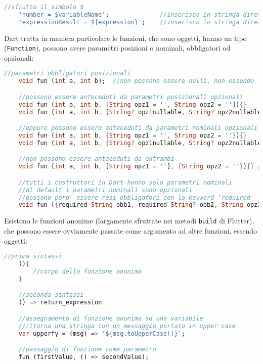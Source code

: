 \begin{lstlisting}[language=dart, firstnumber=1,caption={Dart interpolazone stringhe}]
    //sfrutto il simbolo $
    'number = $variableName';              //inserisco in stringa direttamente una variabile
    'expressionResult = ${expression}';    //inserisco in stringa direttamente un'espressione
\end{lstlisting}

Dart tratta in maniera particolare le funzioni, che sono oggetti, hanno un tipo (\verb+Function+), possono avere parametri posizioni o nominali, obbligatori od opzionali: 

\begin{lstlisting}[language=dart, firstnumber=1,caption={Dart parametri funzioni}]
    //parametri obbligatori posizionali
    void fun (int a, int b);  //non possono essere nulli, non essendo 'int? a'

    //possono essere anteceduti da parametri posizionali opzionali
    void fun (int a, int b, [String opz1 = '', String opz2 = '']){}
    void fun (int a, int b, [String? opz1nullable, String? opz2nullable]){}

    //oppure possono essere anteceduti da parametri nominali opzionali
    void fun (int a, int b, {String opz1 = '', String opz2 = ''}){}
    void fun (int a, int b, {String? opz1nullable, String? opz2nullable}){}

    //non possono essere anteceduti da entrambi
    void fun (int a, int b, [String opz1 = ''], {String opz2 = ''}){} //compile error

    //tutti i costruttori in Dart hanno solo parametri nominali
    //di default i parametri nominali sono opzionali
    //possono pero' essere resi obbligatori con la keyword 'required'
    void fun ({required String obb1, required String? obb2, String opz1 = ''}){}
\end{lstlisting}

Esistono le funzioni anonime (largamente sfruttate nei metodi \verb+build+ di Flutter), che possono essere ovviamente passate come argomento ad altre funzioni, essendo oggetti:

\begin{lstlisting}[language=dart, firstnumber=1,caption={Dart funzioni anonime}]
    //prima sintassi
    (){
        //corpo della funzione anonima
    } 

    //seconda sintassi
    () => return_expression

    //assegnamento di funzione anonima ad una variabile
    //ritorna una stringa con un messaggio portato in upper case
    var upperfy = (msg) => '${msg.toUpperCase()}';

    //passaggio di funzione come parametro
    fun (firstValue, () => secondValue);
\end{lstlisting}

